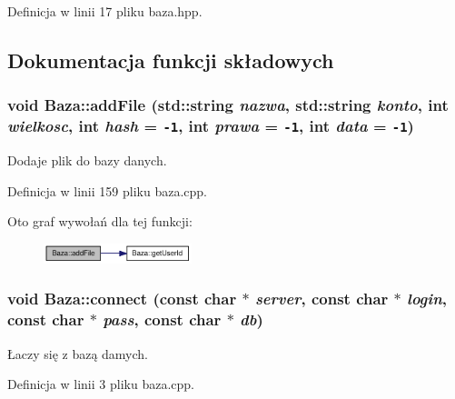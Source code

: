 Definicja w linii 17 pliku baza.hpp.

\subsection{Dokumentacja funkcji składowych}
\hypertarget{a00001_f1bda4acd20e6fd00a35c43638e48956}{
\subsubsection[{addFile}]{\setlength{\rightskip}{0pt plus 5cm}void Baza::addFile (std::string {\em nazwa}, \/  std::string {\em konto}, \/  int {\em wielkosc}, \/  int {\em hash} = {\tt -1}, \/  int {\em prawa} = {\tt -1}, \/  int {\em data} = {\tt -1})}}
\label{a00001_f1bda4acd20e6fd00a35c43638e48956}


Dodaje plik do bazy danych. 



Definicja w linii 159 pliku baza.cpp.

Oto graf wywołań dla tej funkcji:\nopagebreak
\begin{figure}[H]
\begin{center}
\leavevmode
\includegraphics[width=122pt]{a00001_f1bda4acd20e6fd00a35c43638e48956_cgraph}
\end{center}
\end{figure}
\hypertarget{a00001_bef61cc396e46d347a47c75e9ef8dfde}{
\subsubsection[{connect}]{\setlength{\rightskip}{0pt plus 5cm}void Baza::connect (const char $\ast$ {\em server}, \/  const char $\ast$ {\em login}, \/  const char $\ast$ {\em pass}, \/  const char $\ast$ {\em db})}}
\label{a00001_bef61cc396e46d347a47c75e9ef8dfde}


Łaczy się z bazą damych. 



Definicja w linii 3 pliku baza.cpp.

